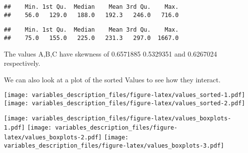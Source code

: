\documentclass[]{article}
\begin{document}
\begin{verbatim}
##    Min. 1st Qu.  Median    Mean 3rd Qu.    Max. 
##    56.0   129.0   188.0   192.3   246.0   716.0
\end{verbatim}

\begin{verbatim}
##    Min. 1st Qu.  Median    Mean 3rd Qu.    Max. 
##    75.0   155.0   225.0   231.3   297.0  1667.0
\end{verbatim}

The values A,B,C have skewness of 0.6571885 0.5329351 and 0.6267024
respectively.

We can also look at a plot of the sorted Values to see how they
interact.

\texttt{[image: variables\_description\_files/figure-latex/values\_sorted-1.pdf]}
\texttt{[image: variables\_description\_files/figure-latex/values\_sorted-2.pdf]}

\texttt{[image: variables\_description\_files/figure-latex/values\_boxplots-1.pdf]}
\texttt{[image: variables\_description\_files/figure-latex/values\_boxplots-2.pdf]}
\texttt{[image: variables\_description\_files/figure-latex/values\_boxplots-3.pdf]}
\end{document}
